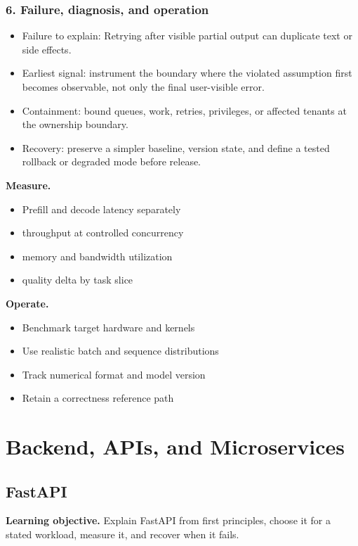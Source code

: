 \subsubsection*{6. Failure, diagnosis, and operation}
\begin{itemize}
\item Failure to explain: Retrying after visible partial output can duplicate text or side effects.
\item Earliest signal: instrument the boundary where the violated assumption first becomes observable, not only the final user-visible error.
\item Containment: bound queues, work, retries, privileges, or affected tenants at the ownership boundary.
\item Recovery: preserve a simpler baseline, version state, and define a tested rollback or degraded mode before release.
\end{itemize}
\textbf{Measure.}\begin{itemize}
\item Prefill and decode latency separately
\item throughput at controlled concurrency
\item memory and bandwidth utilization
\item quality delta by task slice
\end{itemize}
\textbf{Operate.}\begin{itemize}
\item Benchmark target hardware and kernels
\item Use realistic batch and sequence distributions
\item Track numerical format and model version
\item Retain a correctness reference path
\end{itemize}
\clearpage\section{Backend, APIs, and Microservices}
\subsection{FastAPI}
\textbf{Learning objective.} Explain FastAPI from first principles, choose it for a stated workload, measure it, and recover when it fails.
